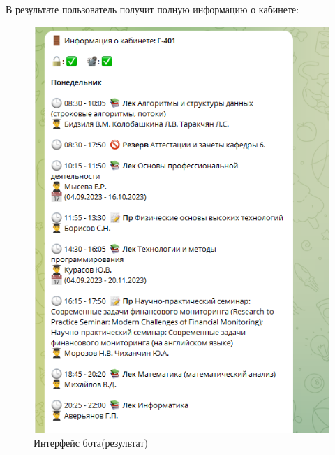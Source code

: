 В результате пользователь получит полную информацию о кабинете:
\begin{figure}[h]
    \centering
    \includegraphics[scale=0.8]{img/7}
    \caption{Интерфейс бота(результат)}
    \label{fig:cp}
\end{figure}
